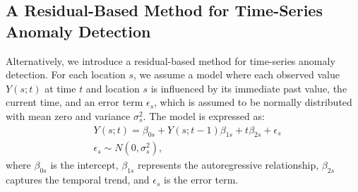 \documentclass[11pt]{article}
\begin{document}
\subsection{A Residual-Based Method for Time-Series Anomaly Detection}\label{sec:Outlier Detection for Individual Location}
Alternatively, we introduce a residual-based method for time-series anomaly detection. For each location $s$, we assume a model where each observed value $Y(s;t)$ at time $t$ and location $s$ is influenced by its immediate past value, the current time, and an error term $\epsilon_s$, which is assumed to be normally distributed with mean zero and variance $\sigma_s^2$. The model is expressed as:
\begin{align}
	&Y(s;t) = \beta_{0s} + Y(s;t-1)\beta_{1s} + t\beta_{2s}+\epsilon_s \\
	&\epsilon_s \sim N(0,\sigma_s^2) \nonumber,
\end{align}
	where $\beta_{0s}$ is the intercept, $\beta_{1s}$ represents the autoregressive relationship, $\beta_{2s}$ captures the temporal trend, and $\epsilon_s$ is the error term.
	
\end{document}

